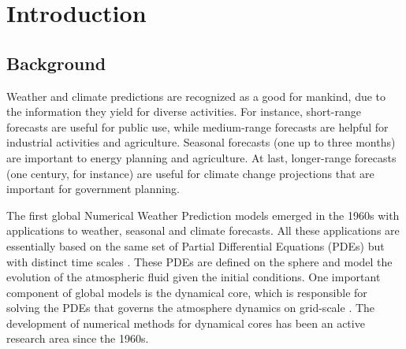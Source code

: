 

\chapter{Introduction}
\label{cap:introduction}

\enlargethispage{.5\baselineskip}

\section{Background}

Weather and climate predictions are recognized as a good for mankind,
due to the information they yield for diverse activities. 
For instance, short-range forecasts are useful for public use, while
medium-range forecasts are helpful for industrial activities and agriculture. 
Seasonal forecasts (one up to three months) are important to energy planning and agriculture.
At last, longer-range forecasts (one century, for instance) are useful for climate change 
projections that are important for government planning.

The first global Numerical Weather Prediction models emerged in the 1960s
with applications to weather, seasonal and climate forecasts. 
All these applications are essentially based on the same set of Partial Differential Equations
(PDEs) but with distinct time scales \citep{stan:2008}. These PDEs are defined on the sphere
and model the evolution of the atmospheric fluid given the initial conditions.
One important component of global models is the dynamical core, which is responsible
for solving the PDEs that governs the atmosphere dynamics on grid-scale \citep{will:2007}. 
The development of numerical methods for dynamical cores has been an active research area since the 1960s.

